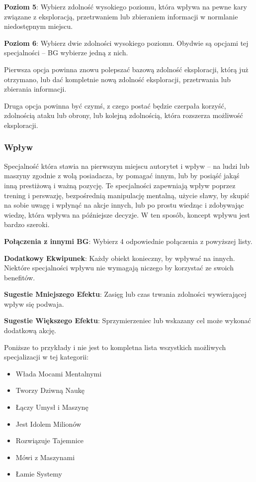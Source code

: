 \textbf{Poziom 5}: Wybierz zdolność wysokiego poziomu, która wpływa na pewne kary związane z eksploracją, przetrwaniem lub zbieraniem informacji w normlanie niedostępnym miejscu.

\textbf{Poziom 6}: Wybierz dwie zdolności wysokiego poziomu. Obydwie są opcjami tej specjalności – BG wybierze jedną z nich.

Pierwsza opcja powinna znowu polepszać bazową zdolność eksploracji, którą już otrzymano, lub dać kompletnie nową zdolność eksploracji, przetrwania lub zbierania informacji.

Druga opcja powinna być czymś, z czego postać będzie czerpała korzyść, zdolnością ataku lub obrony, lub kolejną zdolnością, która rozszerza możliwość eksploracji.

\subsubsection{Wpływ}

Specjalność która stawia na pierwszym miejscu autorytet i wpływ – na ludzi lub maszyny zgodnie z wolą posiadacza, by pomagać innym, lub by posiąść jakąś inną prestiżową i ważną pozycję. Te specjalności zapewniają wpływ poprzez trening i perswazję, bezpośrednią manipulację mentalną, użycie sławy, by skupić na sobie uwagę i wpłynąć na akcje innych, lub po prostu wiedząc i zdobywając wiedzę, która wpływa na późniejsze decyzje. W ten sposób, koncept wpływu jest bardzo szeroki.

\textbf{Połączenia z innymi BG}: Wybierz 4 odpowiednie połączenia z powyższej listy.

\textbf{Dodatkowy Ekwipunek}: Każdy obiekt konieczny, by wpływać na innych. Niektóre specjalności wpływu nie wymagają niczego by korzystać ze swoich benefitów.

\textbf{Sugestie Mniejszego Efektu}: Zasięg lub czas trwania zdolności wywierającej wpływ się podwaja.

\textbf{Sugestie Większego Efektu}: Sprzymierzeniec lub wskazany cel może wykonać dodatkową akcję.

Poniższe to przykłady i nie jest to kompletna lista wszystkich możliwych specjalizacji w tej kategorii:

\begin{itemize}
\item Włada Mocami Mentalnymi
\item Tworzy Dziwną Naukę
\item Łączy Umysł i Maszynę
\item Jest Idolem Milionów
\item Rozwiązuje Tajemnice
\item Mówi z Maszynami
\item Łamie Systemy
\end{itemize}

